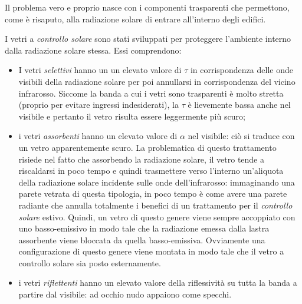 Il problema vero e proprio nasce con i componenti trasparenti che permettono, come è risaputo, alla radiazione solare di entrare all'interno degli edifici.

I vetri a \emph{controllo solare} sono stati sviluppati per proteggere l'ambiente interno dalla radiazione solare stessa. Essi comprendono:
\begin{itemize}
	\item I vetri \emph{selettivi} hanno un un elevato valore di $\tau$ in corrispondenza delle onde visibili della radiazione solare per poi annullarsi in corrispondenza del vicino infrarosso. Siccome la banda a cui i vetri sono trasparenti è molto stretta (proprio per evitare ingressi indesiderati), la $\tau$ è lievemente bassa anche nel visibile e pertanto il vetro risulta essere leggermente più scuro;
	\item i vetri \emph{assorbenti} hanno un elevato valore  di $\alpha$ nel visibile: ciò si traduce con un vetro apparentemente scuro. La problematica di questo trattamento risiede nel fatto che assorbendo la radiazione solare, il vetro tende a riscaldarsi in poco tempo e quindi trasmettere verso l'interno un'aliquota della radiazione solare incidente sulle onde dell'infrarosso: immaginando una parete vetrata di questa tipologia, in poco tempo è come avere una parete radiante che annulla totalmente i benefici di un trattamento per il \emph{controllo solare} estivo. Quindi, un vetro di questo genere viene sempre accoppiato con uno basso-emissivo in modo tale che la radiazione emessa dalla lastra assorbente viene bloccata da quella basso-emissiva. Ovviamente una configurazione di questo genere viene montata in modo tale che il vetro a controllo solare sia posto esternamente.
	\item i vetri \emph{riflettenti} hanno un elevato valore della riflessività su tutta la banda a partire dal visibile: ad occhio nudo appaiono come specchi.
\end{itemize}

